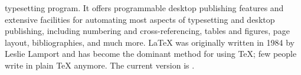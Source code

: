 \documentclass[12pt]{scrreprt}
\begin{document}
%
typesetting program. It offers programmable desktop
publishing features and extensive facilities for
automating most aspects of typesetting and desktop
publishing, including numbering and cross-referencing,
tables and figures, page layout, bibliographies, and
much more. \LaTeX{} was originally written in 1984 by
Leslie Lamport and has become the dominant method for
using \TeX; few people write in plain \TeX{} anymore.
The current version is \LaTeXe.

\end{document}
